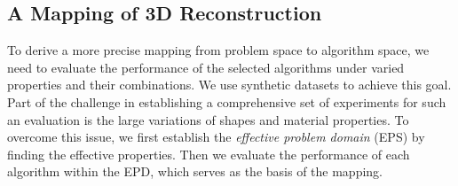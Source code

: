 
\subsection{A Mapping of 3D Reconstruction}
To derive a more precise mapping from problem space to algorithm space, we need to evaluate the performance of the selected algorithms under varied properties and their combinations. We use synthetic datasets to achieve this goal. Part of the challenge in establishing a comprehensive set of experiments for such an evaluation is the large variations of shapes and material properties. To overcome this issue, we first establish the \textit{effective problem domain} (EPS) by finding the effective properties. Then we evaluate the performance of each algorithm within the EPD, which serves as the basis of the mapping.




